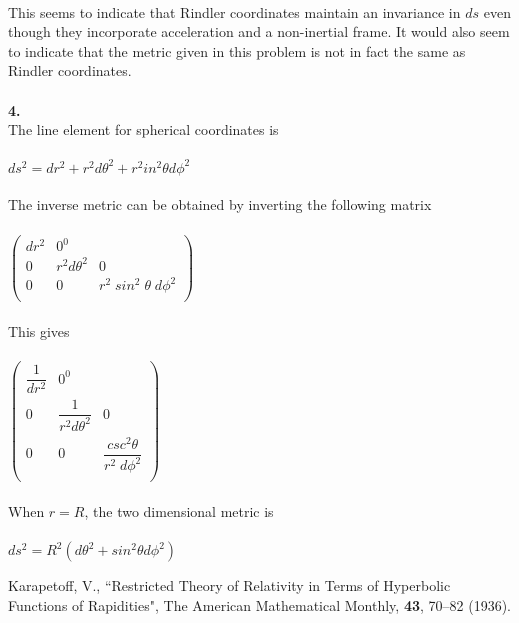 \documentclass[prb,preprint]
{revtex4-1}
\newcommand{\PRLsep}{\noindent\makebox[\linewidth]{\resizebox{0.8888\linewidth}{2pt}{$\bullet$}}\bigskip}
\begin{document}
\\
This seems to indicate that Rindler coordinates maintain an invariance in $ds$ even though they incorporate acceleration and a non-inertial frame.  It would also seem to indicate that the metric given in this problem is not in fact the same as Rindler coordinates.
\\
\\
\PRLsep
\newpage
\textbf{4.}
\\
The line element for spherical coordinates is 
\\
\\
$ds^2 = dr^2 + r^2d\theta^2 + r^2in^2\theta d\phi^2$
\\
\\
The inverse metric can be obtained by inverting the following matrix
\\
\\
$\begin{pmatrix}
dr^2 & 0 ^ 0\\
0 & r^2d\theta^2 & 0\\
0 & 0 & r^2\;sin^2\;\theta\;d\phi^2\\
\end{pmatrix}$
\\
\\
This gives
\\
\\
$\begin{pmatrix}
\dfrac{1}{dr^2} & 0 ^ 0\\
0 & \dfrac{1}{r^2d\theta^2} & 0\\
0 & 0 & \dfrac{csc^2\theta}{r^2\;d\phi^2}\\
\end{pmatrix}$
\\
\\
When $r = R$, the two dimensional metric is 
\\
\\
$ds^2 = R^2\left(d\theta^2 + sin^2\theta d\phi^2\right)$
\\
\PRLsep
\newpage
\begin{thebibliography}{99}

 Karapetoff, V., ``Restricted Theory of Relativity in Terms of Hyperbolic Functions of Rapidities", The American Mathematical Monthly, \textbf{43}, 70--82 (1936).  


\end{thebibliography}
\end{document}
